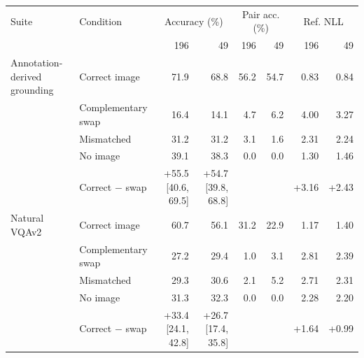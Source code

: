 \begin{tabular}{llrrrrrr}
\toprule
Suite & Condition & \multicolumn{2}{c}{Accuracy (\%)} & \multicolumn{2}{c}{Pair acc. (\%)} & \multicolumn{2}{c}{Ref. NLL} \\
 & & 196 & 49 & 196 & 49 & 196 & 49 \\
\midrule
Annotation-derived grounding & Correct image & 71.9 & 68.8 & 56.2 & 54.7 & 0.83 & 0.84 \\
 & Complementary swap & 16.4 & 14.1 & 4.7 & 6.2 & 4.00 & 3.27 \\
 & Mismatched & 31.2 & 31.2 & 3.1 & 1.6 & 2.31 & 2.24 \\
 & No image & 39.1 & 38.3 & 0.0 & 0.0 & 1.30 & 1.46 \\
 & Correct $-$ swap & +55.5 [40.6, 69.5] & +54.7 [39.8, 68.8] & & & +3.16 & +2.43 \\
\midrule
Natural VQAv2 & Correct image & 60.7 & 56.1 & 31.2 & 22.9 & 1.17 & 1.40 \\
 & Complementary swap & 27.2 & 29.4 & 1.0 & 3.1 & 2.81 & 2.39 \\
 & Mismatched & 29.3 & 30.6 & 2.1 & 5.2 & 2.71 & 2.31 \\
 & No image & 31.3 & 32.3 & 0.0 & 0.0 & 2.28 & 2.20 \\
 & Correct $-$ swap & +33.4 [24.1, 42.8] & +26.7 [17.4, 35.8] & & & +1.64 & +0.99 \\
\bottomrule
\end{tabular}
